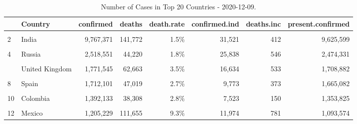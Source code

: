 \begin{table}[!h]
\caption{\label{tab:} Number of Cases in Top 20 Countries - 2020-12-09.}
\centering
\fontsize{7}{9}\selectfont
\begin{tabular}[t]{llrrrrrr}
\toprule
  & Country & confirmed & deaths & death.rate & confirmed.ind & deaths.inc & present.confirmed\\
\midrule
\cellcolor{gray!6}{1} & \cellcolor{gray!6}{US} & \cellcolor{gray!6}{15,386,562} & \cellcolor{gray!6}{289,373} & \cellcolor{gray!6}{1.9\%} & \cellcolor{gray!6}{221,267} & \cellcolor{gray!6}{3,124} & \cellcolor{gray!6}{15,097,189}\\
2 & India & 9,767,371 & 141,772 & 1.5\% & 31,521 & 412 & 9,625,599\\
\cellcolor{gray!6}{3} & \cellcolor{gray!6}{Brazil} & \cellcolor{gray!6}{6,728,452} & \cellcolor{gray!6}{178,995} & \cellcolor{gray!6}{2.7\%} & \cellcolor{gray!6}{53,453} & \cellcolor{gray!6}{836} & \cellcolor{gray!6}{6,549,457}\\
4 & Russia & 2,518,551 & 44,220 & 1.8\% & 25,838 & 546 & 2,474,331\\
\cellcolor{gray!6}{5} & \cellcolor{gray!6}{France} & \cellcolor{gray!6}{2,377,913} & \cellcolor{gray!6}{56,752} & \cellcolor{gray!6}{2.4\%} & \cellcolor{gray!6}{14,717} & \cellcolor{gray!6}{299} & \cellcolor{gray!6}{2,321,161}\\
\addlinespace
6 & United Kingdom & 1,771,545 & 62,663 & 3.5\% & 16,634 & 533 & 1,708,882\\
\cellcolor{gray!6}{7} & \cellcolor{gray!6}{Italy} & \cellcolor{gray!6}{1,770,149} & \cellcolor{gray!6}{61,739} & \cellcolor{gray!6}{3.5\%} & \cellcolor{gray!6}{12,755} & \cellcolor{gray!6}{499} & \cellcolor{gray!6}{1,708,410}\\
8 & Spain & 1,712,101 & 47,019 & 2.7\% & 9,773 & 373 & 1,665,082\\
\cellcolor{gray!6}{9} & \cellcolor{gray!6}{Argentina} & \cellcolor{gray!6}{1,475,222} & \cellcolor{gray!6}{40,222} & \cellcolor{gray!6}{2.7\%} & \cellcolor{gray!6}{5,303} & \cellcolor{gray!6}{213} & \cellcolor{gray!6}{1,435,000}\\
10 & Colombia & 1,392,133 & 38,308 & 2.8\% & 7,523 & 150 & 1,353,825\\
\addlinespace
\cellcolor{gray!6}{11} & \cellcolor{gray!6}{Germany} & \cellcolor{gray!6}{1,254,358} & \cellcolor{gray!6}{20,460} & \cellcolor{gray!6}{1.6\%} & \cellcolor{gray!6}{25,089} & \cellcolor{gray!6}{458} & \cellcolor{gray!6}{1,233,898}\\
12 & Mexico & 1,205,229 & 111,655 & 9.3\% & 11,974 & 781 & 1,093,574\\

\end{tabular}
\end{table}
